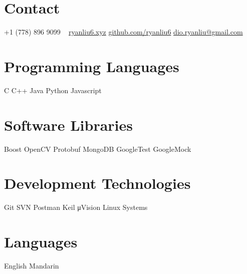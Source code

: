 \documentclass[]{cv-style}          %
\begin{document}


\begin{aside}
%
\section{Contact}
+1 (778) 896 9099
~
\href{http://ryanliu6.xyz}{ryanliu6.xyz}
\href{https://github.com/ryanliu6}{github.com/ryanliu6}
\href{mailto:dio.ryanliu@gmail.com}{dio.ryanliu@gmail.com}
\section{Programming Languages}
C
C++
Java
Python
Javascript
\section{Software Libraries}
Boost
OpenCV
Protobuf
MongoDB
GoogleTest
GoogleMock
\section{Development Technologies}
Git
SVN
Postman
Keil μVision
Linux Systems
\section{Languages}
English
Mandarin
%
\end{aside}




\end{document}
